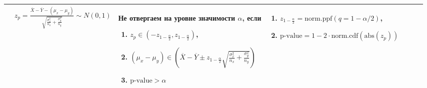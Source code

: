 \documentclass[14pt, a1paper, fleqn]{extarticle}
\begin{document}
\begin{center}
\begin{tabular}{|p{6cm}|p{8cm}|p{3cm}|p{3cm}|p{9cm}|p{10cm}|p{14cm}|}
            & \( z_p = \frac{\overline{X} - \overline{Y} - (\mu_x - \mu_y)}{ \sqrt{\frac{\sigma_x^2}{n_x} + \frac{\sigma_y^2}{n_y}} } \sim N(0, 1) \) 
            & Не отвергаем на уровне значимости \( \alpha \), если 
            \begin{enumerate}
                \item \( z_p \in \left( -z_{1-\frac{\alpha}{2}}, z_{1-\frac{\alpha}{2}} \right) \),
                \item \( (\mu_x - \mu_y) \in \left( \overline{X} - \overline{Y} \pm z_{1-\frac{\alpha}{2}} \sqrt{\frac{\sigma_x^2}{n_x} + \frac{\sigma_y^2}{n_y}} \right) \)
                \item \( \text{p-value} > \alpha \)
            \end{enumerate} 
            & \begin{enumerate}
                \item \( z_{1-\frac{\alpha}{2}} = \text{norm.ppf}(q=1 - \alpha/2) \),
                \item \( \text{p-value} = 1 - 2 \cdot \text{norm.cdf}(\text{abs}(z_p)) \)
            \end{enumerate} \\
            \hline
        \end{tabular}
    \end{center}
\end{document}
